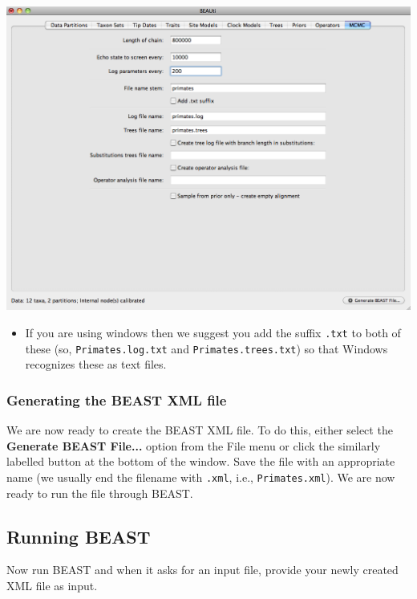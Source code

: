 \documentclass[12pt]{article}
\begin{document}
\includegraphics[scale=0.4]{figures/BEAUti_MCMC}

\medskip{}

\begin{itemize}
\item If you are using windows then we suggest you add the suffix \texttt{.txt} to both of these (so,
\texttt{Primates.log.txt} and \texttt{Primates.trees.txt}) so that Windows recognizes
these as text files. 
\end{itemize}

\subsubsection*{Generating the BEAST XML file }

We are now ready to create the BEAST XML file. To do this,
either select the {\bf Generate BEAST File...} option from the File menu or click the similarly labelled button at the bottom of the
window. Save the file with an appropriate name
(we usually end the filename with \texttt{.xml}, i.e., \texttt{Primates.xml}).
We are now ready to run the file through BEAST. 

\subsection*{Running BEAST }

Now run BEAST and when it asks for an input file, provide your newly
created XML file as input. 

\medskip{}
\end{document}
